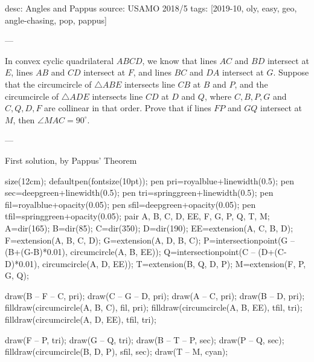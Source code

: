 desc: Angles and Pappus
source: USAMO 2018/5
tags: [2019-10, oly, easy, geo, angle-chasing, pop, pappus]

---

In convex cyclic quadrilateral $ABCD$, we know that lines $AC$ and $BD$ intersect at $E$, lines $AB$ and $CD$ intersect at $F$, and lines $BC$ and $DA$ intersect at $G$. Suppose that the circumcircle of $\triangle ABE$ intersects line $CB$ at $B$ and $P$, and the circumcircle of $\triangle ADE$ intersects line $CD$ at $D$ and $Q$, where $C,B,P,G$ and $C,Q,D,F$ are collinear in that order. Prove that if lines $FP$ and $GQ$ intersect at $M$, then $\angle MAC=90^\circ$.

---

\begin{customenv}{First solution, by Pappus' Theorem}\
    \begin{center}
        \begin{asy}
            size(12cm);
            defaultpen(fontsize(10pt));
            pen pri=royalblue+linewidth(0.5);
            pen sec=deepgreen+linewidth(0.5);
            pen tri=springgreen+linewidth(0.5);
            pen fil=royalblue+opacity(0.05);
            pen sfil=deepgreen+opacity(0.05);
            pen tfil=springgreen+opacity(0.05);
            pair A, B, C, D, EE, F, G, P, Q, T, M;
            A=dir(165);
            B=dir(85);
            C=dir(350);
            D=dir(190);
            EE=extension(A, C, B, D);
            F=extension(A, B, C, D);
            G=extension(A, D, B, C);
            P=intersectionpoint(G -- (B+(G-B)*0.01), circumcircle(A, B, EE));
            Q=intersectionpoint(C -- (D+(C-D)*0.01), circumcircle(A, D, EE));
            T=extension(B, Q, D, P);
            M=extension(F, P, G, Q);

            draw(B -- F -- C, pri); draw(C -- G -- D, pri); draw(A -- C, pri); draw(B -- D, pri); filldraw(circumcircle(A, B, C), fil, pri);
            filldraw(circumcircle(A, B, EE), tfil, tri); filldraw(circumcircle(A, D, EE), tfil, tri);

            draw(F -- P, tri); draw(G -- Q, tri);
            draw(B -- T -- P, sec); draw(P -- Q, sec); filldraw(circumcircle(B, D, P), sfil, sec);
            draw(T -- M, cyan);


\end{asy}
\end{center}
\end{customenv}
